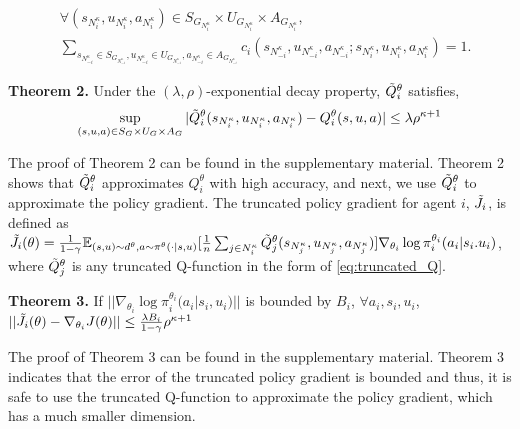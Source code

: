 \documentclass[conf]{new-aiaa}
\begin{document}
\begin{equation}
\begin{aligned}
   & \forall (s_{N_i^\kappa},u_{N_i^\kappa},a_{N_i^\kappa}) \in S_{G_{N_i^\kappa}} \times U_{G_{N_i^\kappa}} \times A_{G_{N_i^\kappa}}, \\
   &\sum_{s_{N_{-i}^\kappa} \in S_{G_{N_{-i}^\kappa}}, u_{N_{-i}^\kappa} \in U_{G_{N_{-i}^\kappa}}, a_{N_{-i}^\kappa} \in A_{G_{N_{-i}^\kappa}}}  c_i(s_{N_{-i}^\kappa},u_{N_{-i}^\kappa},a_{N_{-i}^\kappa}; s_{N_i^\kappa},u_{N_i^\kappa},a_{N_i^\kappa}) =1.
\end{aligned}
\end{equation}

\textbf{Theorem 2.} Under the $(\lambda, \rho)$-exponential decay property, $\Tilde{Q}_i^\theta$ satisfies,
\begin{equation}
    \sup_{(s, u, a) \in S_G \times U_G \times A_G} |\Tilde{Q}_i^\theta(s_{N_i^\kappa}, u_{N_i^\kappa}, a_{N_i^\kappa})-Q_i^\theta(s, u,a)| \le \lambda \rho^{\kappa + 1}
\end{equation}

The proof of Theorem 2 can be found in the supplementary material. Theorem 2 shows that $\Tilde{Q}_i^\theta$ approximates $Q_i^\theta$ with high accuracy, and next, we use $\Tilde{Q}_i^\theta$ to approximate the policy gradient. The truncated policy gradient for agent $i$, $\Tilde{J}_i$, is defined as $\Tilde{J}_i(\theta) = \frac{1}{1-\gamma} \mathbb{E}_{(s,u) \sim d^\theta, a \sim \pi^\theta(\cdot |s,u)} [\frac{1}{n} \sum_{j \in N_i^\kappa} \Tilde{Q}_j^\theta(s_{N_j^\kappa}, u_{N_j^\kappa}, a_{N_j^\kappa})] \nabla_{\theta_i} \log \pi_i^{\theta_i}(a_i|s_i. u_i)$, where $\Tilde{Q}_j^\theta$ is any truncated Q-function in the form of \cref{eq:truncated_Q}.

\textbf{Theorem 3.} If $||\nabla_{\theta_i}\log \pi_i^{\theta_i}(a_i|s_i, u_i)||$ is bounded by $B_i$, $\forall a_i, s_i, u_i$, $||\Tilde{J}_i(\theta) - \nabla_{\theta_i} J(\theta)|| \le \frac{\lambda B_i}{1-\gamma} \rho^{\kappa+1}$

The proof of Theorem 3 can be found in the supplementary material. Theorem 3 indicates that the error of the truncated policy gradient is bounded and thus, it is safe to use the truncated Q-function to approximate the policy gradient, which has a much smaller dimension. 
\end{document}
